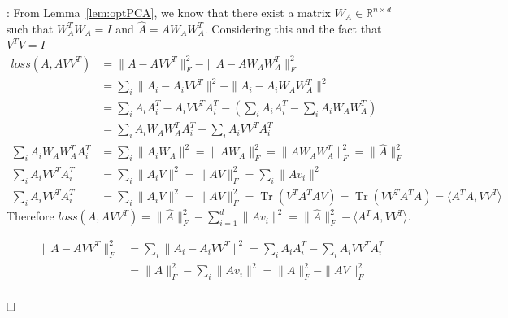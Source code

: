 \documentclass{article}
\newenvironment{proofof}[1]{\smallskip\noindent{\bf Proof of #1}:}{$\hfill \Box$\\}
\DeclareMathOperator{\Tr}{Tr}
\begin{document}
\begin{proofof}{Lemma~\ref{lem:B}}
From Lemma~\ref{lem:optPCA}, we know that there exist a matrix $W_A \in \mathbb{R}^{n\times d}$ such that $W_A^T W_A = I$ and $\widehat{A} = A W_A W_A^T$. Considering this and the fact that $V^TV=I$
\begin{align*}
        loss(A, AVV^T) &= \|A-AVV^T\|_F^2 - \|A-AW_AW_A^T\|_F^2 \\
        &= \sum_{i} \|A_i - A_i VV^T\|^2 - \|A_i - A_i W_A W_A^T\|^2 \\
        & = \sum_i A_i A_i^T -  A_i VV^T A_i^T - (\sum_i A_i A_i^T - \sum_i A_i W_A W_A^T)\\
        & =\sum_{i} A_i W_A W_A^T A_i^T - \sum_{i} A_i VV^T A_i^T \\
        \sum_{i} A_i W_A W_A^T A_i^T &= \sum_i \|A_i W_A\|^2 = \|AW_A\|_F^2 = \|AW_A W_A^T\|_F^2 = \|\widehat{A}\|_F^2 \\
        \sum_{i} A_i VV^T A_i^T &= \sum_i \|A_i V\|^2 = \|AV\|_F^2 = \sum_i \|Av_i\|^2 \\
        \sum_{i} A_i VV^T A_i^T &= \sum_i \|A_i V\|^2 = \|AV\|_F^2 = \Tr(V^TA^TAV) = \Tr(VV^TA^TA) = \langle A^TA, VV^T\rangle
\end{align*}
Therefore $loss(A, AVV^T) = \|\widehat{A}\|_F^2 - \sum_{i=1}^{d} \|Av_i\|^2 = \|\widehat{A}\|_F^2 - \langle A^TA, VV^T\rangle$.

\begin{align*}
        \|A - AVV^T\|_F^2 &= \sum_i \|A_i - A_iVV^T\|^2 = \sum_i A_i A_i^T - \sum_i A_iVV^TA_i^T\\
        &= \|A\|_F^2 - \sum_i \|Av_i\|^2 = \|A\|_F^2 - \|AV\|_F^2 \\
\end{align*}

\end{proofof}
\end{document}

